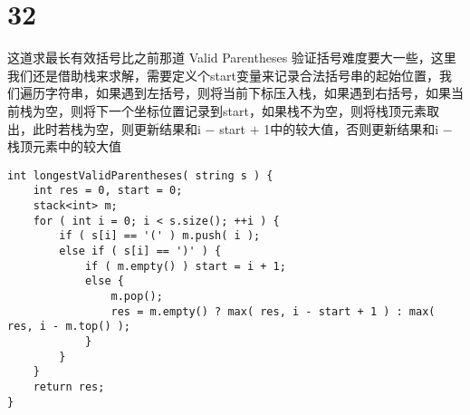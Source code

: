 \documentclass[12pt,a4paper]{article}
\begin{document}
\section{32}
\begin{CJK}{UTF8}{gbsn}
这道求最长有效括号比之前那道 Valid Parentheses 验证括号难度要大一些，这里我们还是借助栈来求解，需要定义个start变量来记录合法括号串的起始位置，我们遍历字符串，如果遇到左括号，则将当前下标压入栈，如果遇到右括号，如果当前栈为空，则将下一个坐标位置记录到start，如果栈不为空，则将栈顶元素取出，此时若栈为空，则更新结果和i $-$ start $+$ 1中的较大值，否则更新结果和i $-$ 栈顶元素中的较大值
\end{CJK}
\begin{lstlisting}
int longestValidParentheses( string s ) {
	int res = 0, start = 0;
	stack<int> m;
	for ( int i = 0; i < s.size(); ++i ) {
		if ( s[i] == '(' ) m.push( i );
		else if ( s[i] == ')' ) {
			if ( m.empty() ) start = i + 1;
			else {
				m.pop();
				res = m.empty() ? max( res, i - start + 1 ) : max( res, i - m.top() );
			}
		}
	}
	return res;
}
\end{lstlisting}
\end{document}
